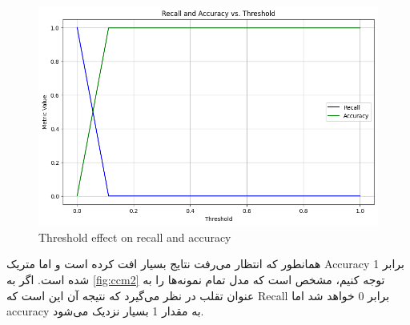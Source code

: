 \documentclass{article}
\begin{document}
\begin{figure}[H]
\centering
\includegraphics[width=1.0\linewidth]{img/C_RA_T_2}
\caption{Threshold effect on recall and accuracy}
\label{fig:crat2}
\end{figure}



همانطور که انتظار می‌رفت نتایج بسیار افت کرده است و اما متریک Accuracy برابر 1 شده است. اگر به ‎\autoref{fig:ccm2}‎ توجه کنیم، مشخص است که مدل تمام نمونه‌ها را به عنوان تقلب در نظر می‌گیرد که نتیجه آن این است که Recall برابر 0 خواهد شد اما accuracy به مقدار 1 بسیار نزدیک می‌شود. 







\end{document}
